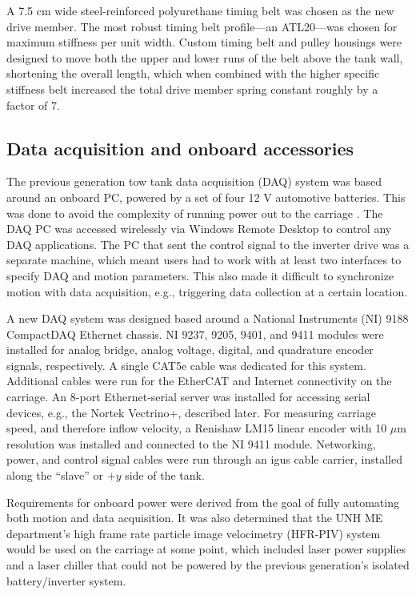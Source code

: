 A 7.5 cm wide steel-reinforced polyurethane timing belt was chosen as the new
drive member. The most robust timing belt profile---an ATL20---was chosen for
maximum stiffness per unit width. Custom timing belt and pulley housings were
designed to move both the upper and lower runs of the belt above the tank wall,
shortening the overall length, which when combined with the higher specific
stiffness belt increased the total drive member spring constant roughly by a
factor of 7.


\subsection{Data acquisition and onboard accessories}

The previous generation tow tank data acquisition (DAQ) system was based around
an onboard PC, powered by a set of four 12 V automotive batteries. This was done
to avoid the complexity of running power out to the carriage \cite{Darnell1996}.
The DAQ PC was accessed wirelessly via Windows Remote Desktop to control any DAQ
applications. The PC that sent the control signal to the inverter drive was a
separate machine, which meant users had to work with at least two interfaces to
specify DAQ and motion parameters. This also made it difficult to synchronize
motion with data acquisition, e.g., triggering data collection at a certain
location.

A new DAQ system was designed based around a National Instruments (NI) 9188
CompactDAQ Ethernet chassis. NI 9237, 9205, 9401, and 9411 modules were
installed for analog bridge, analog voltage, digital, and quadrature encoder
signals, respectively. A single CAT5e cable was dedicated for this system.
Additional cables were run for the EtherCAT and Internet connectivity on the
carriage. An 8-port Ethernet-serial server was installed for accessing serial
devices, e.g., the Nortek Vectrino+, described later. For measuring carriage
speed, and therefore inflow velocity, a Renishaw LM15 linear encoder with 10
$\mu$m resolution was installed and connected to the NI 9411 module. Networking,
power, and control signal cables were run through an igus cable carrier,
installed along the ``slave'' or $+y$ side of the tank.

Requirements for onboard power were derived from the goal of fully automating
both motion and data acquisition. It was also determined that the UNH ME
department's high frame rate particle image velocimetry (HFR-PIV) system would
be used on the carriage at some point, which included laser power supplies and a
laser chiller that could not be powered by the previous generation's isolated
battery/inverter system.


